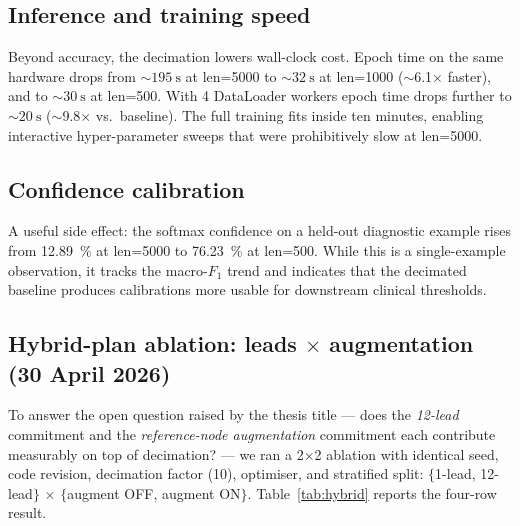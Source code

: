 \documentclass[conference]{IEEEtran}
\begin{document}
\subsection{Inference and training speed}
Beyond accuracy, the decimation lowers wall-clock cost. Epoch time on
the same hardware drops from $\sim\SI{195}{\second}$ at len=\num{5000}
to $\sim\SI{32}{\second}$ at len=\num{1000}
($\sim$6.1$\times$ faster), and to $\sim\SI{30}{\second}$ at
len=\num{500}. With 4 DataLoader workers epoch time drops further to
$\sim\SI{20}{\second}$ ($\sim$9.8$\times$ vs.\ baseline). The full
training fits inside ten minutes, enabling interactive
hyper-parameter sweeps that were prohibitively slow at len=\num{5000}.

\subsection{Confidence calibration}
A useful side effect: the softmax confidence on a held-out diagnostic
example rises from \SI{12.89}{\percent} at len=\num{5000} to
\SI{76.23}{\percent} at len=\num{500}. While this is a single-example
observation, it tracks the macro-$F_1$ trend and indicates that the
decimated baseline produces calibrations more usable for downstream
clinical thresholds.

\subsection{Hybrid-plan ablation: leads $\times$ augmentation
            (\num{30} April \num{2026})}
\label{sec:hybrid}
To answer the open question raised by the thesis title — does the
\emph{12-lead} commitment and the \emph{reference-node augmentation}
commitment each contribute measurably on top of decimation? — we ran a
2$\times$2 ablation with identical seed, code revision, decimation
factor (10), optimiser, and stratified split: $\{$1-lead, 12-lead$\}$
$\times$ $\{$augment OFF, augment ON$\}$.
Table~\ref{tab:hybrid} reports the four-row result.
\end{document}
